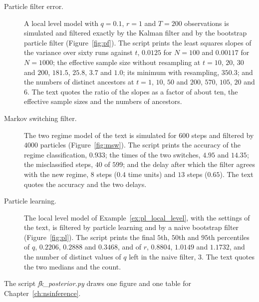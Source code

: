 \begin{description}
\item[Particle filter error.] A local level model with $q=0.1$, $r=1$ and $T=200$ observations is simulated and filtered exactly by the Kalman filter and by the bootstrap particle filter (Figure~\ref{fig:pf}). The script prints the least squares slopes of the variance over sixty runs against $t$, $0.0125$ for $N=100$ and $0.00117$ for $N=1000$; the effective sample size without resampling at $t=10$, $20$, $30$ and $200$, $181.5$, $25.8$, $3.7$ and $1.0$; its minimum with resampling, $350.3$; and the numbers of distinct ancestors at $t=1$, $10$, $50$ and $200$, $570$, $105$, $20$ and $6$. The text quotes the ratio of the slopes as a factor of about ten, the effective sample sizes and the numbers of ancestors.
\item[Markov switching filter.] The two regime model of the text is simulated for $600$ steps and filtered by $4000$ particles (Figure~\ref{fig:msw}). The script prints the accuracy of the regime classification, $0.933$; the times of the two switches, $4.95$ and $14.35$; the misclassified steps, $40$ of $599$; and the delay after which the filter agrees with the new regime, $8$ steps ($0.4$ time units) and $13$ steps ($0.65$). The text quotes the accuracy and the two delays.
\item[Particle learning.] The local level model of Example~\ref{ex:pl_local_level}, with the settings of the text, is filtered by particle learning and by a naive bootstrap filter (Figure~\ref{fig:pl}). The script prints the final $5$th, $50$th and $95$th percentiles of $q$, $0.2206$, $0.2888$ and $0.3468$, and of $r$, $0.8804$, $1.0149$ and $1.1732$, and the number of distinct values of $q$ left in the naive filter, $3$. The text quotes the two medians and the count.
\end{description}

The script \textit{fk\_posterior.py} draws one figure and one table for Chapter~\ref{ch:nsinference}.

